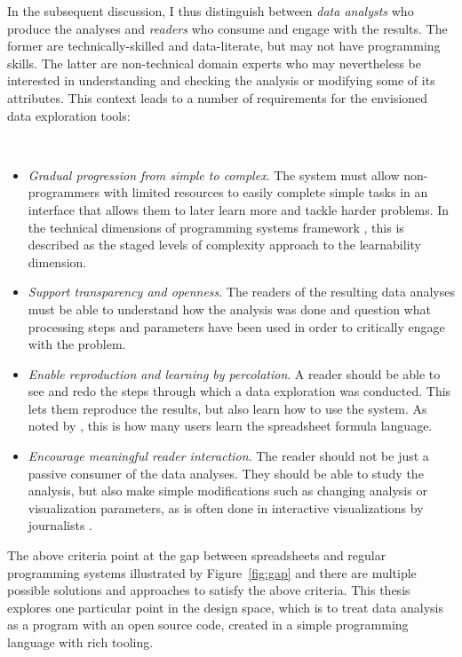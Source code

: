 \documentclass[fleqn,11pt]{report}
\theoremstyle{definition}
\newenvironment{nitemize}
{ \vspace{-0.4em}
  \begin{itemize}
    \setlength{\itemsep}{5pt}
    \setlength{\parskip}{0pt}
    \setlength{\parsep}{0pt} }
{ \end{itemize}
  \vspace{-0.4em} }
\begin{document}
In the subsequent discussion, I thus distinguish between \emph{data analysts} who produce the
analyses and \emph{readers} who consume and engage with the results. The former are
technically-skilled and data-literate, but may not have programming skills. The latter are
non-technical domain experts who may nevertheless be interested
in understanding and checking the analysis or modifying some of its attributes.
This context leads to a number of requirements for the envisioned data exploration tools:

~

\begin{nitemize}
\item \emph{Gradual progression from simple to complex}. The system must allow non-program\-mers with
limited resources to easily complete simple tasks in an interface that allows them to later
learn more and tackle harder problems. In the technical dimensions of programming systems
framework \citep{jakubovic-2023-techdims}, this is described as the staged levels of complexity
approach to the learnability dimension.

\item \emph{Support transparency and openness}. The readers of the resulting data analyses must
be able to understand how the analysis was done and question what processing steps and parameters
have been used in order to critically engage with the problem.

\item \emph{Enable reproduction and learning by percolation}. A reader should be able to see and
redo the steps through which a data exploration was conducted. This lets them reproduce the results,
but also learn how to use the system. As noted by \citet{sarkar-2018-spreadsheets}, this is how
many users learn the spreadsheet formula language.

\item \emph{Encourage meaningful reader interaction}. The reader should not be just a passive
consumer of the data analyses. They should be able to study the analysis, but
also make simple modifications such as changing analysis or visualization parameters,
as is often done in interactive visualizations by journalists \citep{kennedy-2021-engagements}.
\end{nitemize}

The above criteria point at the gap between spreadsheets and regular programming systems
illustrated by Figure~\ref{fig:gap} and there are multiple possible solutions and approaches to
satisfy the above criteria. This thesis explores one particular point in the design space,
which is to treat data analysis as a program with an open source code, created in a simple
programming language with rich tooling.
\end{document}

